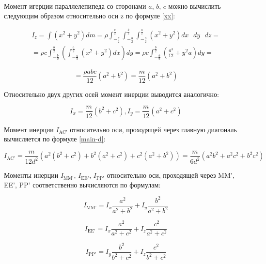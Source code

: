 \documentclass[a4paper,12pt]{article}
\begin{document}
Момент игерции параллелепипеда со сторонами $a$, $b$, $c$ можно вычислить следующим образом относительно оси z по формуле \eqref{xx}:

\begin{multline*}
    I_{z} = \int \left(x^2 + y^2 \right) dm = \rho \int_{-\frac{c}{2}}^{\frac{c}{2}} \int_{-\frac{b}{2}}^{\frac{b}{2}} \int_{-\frac{a}{2}}^{\frac{a}{2}} (x^2 + y^2 ) dx \text{ } dy \text{ } dz = \\
    = \rho c \int_{-\frac{b}{2}}^{\frac{b}{2}} \left( \int_{-\frac{a}{2}}^{\frac{a}{2}} (x^2 + y^2 ) dx \right) dy = \rho c \int_{-\frac{b}{2}}^{\frac{b}{2}} \left( \frac{a^3}{12} + y^2 a \right) dy =
\end{multline*}

\begin{equation}\label{cilinder-z}
    = \frac{\rho abc}{12} (a^2 + b^2) = \frac{m}{12} (a^2 + b^2)
\end{equation}

Относительно двух других осей момент инерции выводится аналогично:

\begin{equation}\label{cilinder-xy}
    I_{x} = \frac{m}{12} (b^2 + c^2), I_{y} = \frac{m}{12} (a^2 + c^2)
\end{equation}

Момент инерции $I_\text{AC'}$ относительно оси, проходящей через главную диагональ вычисляется по формуле \eqref{main-d}:

\begin{equation}\label{cilinder-AC}
    I_\text{AC'} = \frac{m}{12d^2} \left(a^2 (b^2 + c^2) + b^2 (a^2 + c^2) + c^2 (a^2 + b^2) \right) = \frac{m}{6d^2} \left( a^2 b^2 + a^2 c^2 + b^2 c^2 \right)
\end{equation}

Моменты инерции $I_\text{MM'}$, $I_\text{EE'}$, $I_\text{PP'}$ относительно оси, проходящей через MM', EE', PP' соответственно вычисляются по формулам:

\begin{equation}\label{cilinder-MM}
    I_\text{MM'} = I_{x} \frac{a^2}{a^2 + b^2} + I_{y} \frac{b^2}{a^2 + b^2}
\end{equation}

\begin{equation}\label{cilinder-EE}
    I_\text{EE'} = I_{x} \frac{a^2}{a^2 + c^2} + I_{z} \frac{c^2}{a^2 + c^2}
\end{equation}

\begin{equation}\label{cilinder-PP}
    I_\text{PP'} = I_{y} \frac{b^2}{b^2 + c^2} + I_{z} \frac{c^2}{b^2 + c^2}
\end{equation}
\end{document}
